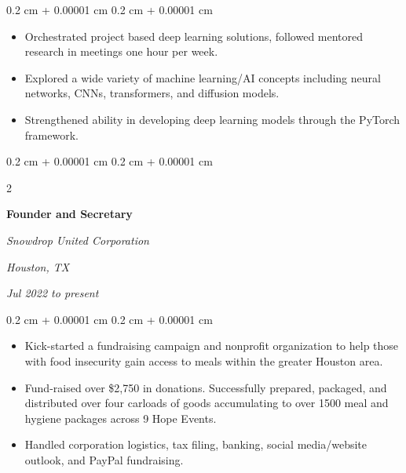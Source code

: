 \documentclass[10pt, letterpaper]{article}
\newenvironment{highlights}{
    \begin{itemize}[
        topsep=0.10 cm,
        parsep=0.10 cm,
        partopsep=0pt,
        itemsep=0pt,
        leftmargin=0.4 cm + 10pt
    ]
}{
    \end{itemize}
} %
\newenvironment{onecolentry}{
    \begin{adjustwidth}{
        0.2 cm + 0.00001 cm
    }{
        0.2 cm + 0.00001 cm
    }
}{
    \end{adjustwidth}
} %
\newenvironment{twocolentry}[2][]{
    \onecolentry
    \def\secondColumn{#2}
    \setcolumnwidth{\fill, 4.5 cm}
    \begin{paracol}{2}
}{
    \switchcolumn \raggedleft \secondColumn
    \end{paracol}
    \endonecolentry
} %
\begin{document}
        \vspace{0.10 cm}
        \begin{onecolentry}
            \begin{highlights}
                \item Orchestrated project based deep learning solutions, followed mentored research in meetings one hour per week.
                \item Explored a wide variety of machine learning/AI concepts including neural networks, CNNs, transformers, and diffusion models.
                \item Strengthened ability in developing deep learning models through the PyTorch framework.
            \end{highlights}
        \end{onecolentry}


        \vspace{0.2 cm}

        \begin{twocolentry}{
        \textit{Houston, TX}    
            
        \textit{Jul 2022 to present}}
            \textbf{Founder and Secretary}
            
            \textit{Snowdrop United Corporation}
        \end{twocolentry}

        \vspace{0.10 cm}
        \begin{onecolentry}
            \begin{highlights}
                \item Kick-started a fundraising campaign and nonprofit organization to help those with food insecurity gain access to meals within the greater Houston area.
                \item Fund-raised over \$2,750 in donations. Successfully prepared, packaged, and distributed over four carloads of goods accumulating to over 1500 meal and hygiene packages across 9 Hope Events.
                \item Handled corporation logistics, tax filing, banking, social media/website outlook, and PayPal fundraising.
            \end{highlights}
        \end{onecolentry}



    
\end{document}
